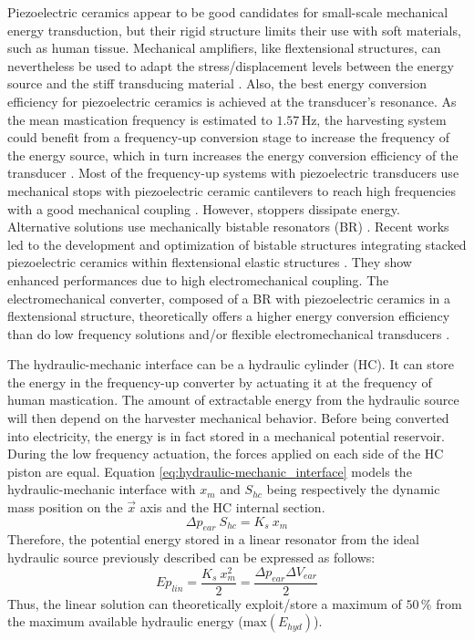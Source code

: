 \documentclass[3p,twocolumn,preprint]{elsarticle}
\begin{document}
Piezoelectric ceramics appear to be good candidates for small-scale mechanical energy transduction, but their rigid structure limits their use with soft materials, such as human tissue. Mechanical amplifiers, like flextensional structures, can nevertheless be used to adapt the stress/displacement levels between the energy source and the stiff transducing material \cite{Abdelnaby2016}. Also, the best energy conversion efficiency for piezoelectric ceramics is achieved at the transducer's resonance. As the mean mastication frequency is estimated to \mbox{$1.57$\,Hz}, the harvesting system could benefit from a frequency-up conversion stage to increase the frequency of the energy source, which in turn increases the energy conversion efficiency of the transducer \cite{Ashraf2011,Peng2021}. Most of the frequency-up systems with piezoelectric transducers use mechanical stops with piezoelectric ceramic cantilevers to reach high frequencies with a good mechanical coupling \cite{Edwards2013,Gu2011,Lee2007}. However, stoppers dissipate energy. Alternative solutions use mechanically bistable resonators (BR) \cite{Vocca2012}. Recent works led to the development and optimization of bistable structures integrating stacked piezoelectric ceramics within flextensional elastic structures \cite{Huguet2017}. They show enhanced performances due to high electromechanical coupling. The electromechanical converter, composed of a BR with piezoelectric ceramics in a flextensional structure, theoretically offers a higher energy conversion efficiency than do low frequency solutions and/or flexible electromechanical transducers \cite{Abdelnaby2016,Peng2021}.

The hydraulic-mechanic interface can be a hydraulic cylinder (HC). It can store the energy in the frequency-up converter by actuating it at the frequency of human mastication. The amount of extractable energy from the hydraulic source will then depend on the harvester mechanical behavior. Before being converted into electricity, the energy is in fact stored in a mechanical potential reservoir. During the low frequency actuation, the forces applied on each side of the HC piston are equal. Equation \ref{eq:hydraulic-mechanic_interface} models the hydraulic-mechanic interface with $x_{m}$ and $ S_{hc}$ being respectively the dynamic mass position on the $\vec{x}$ axis and the HC internal section.
\begin{equation}
	\Delta p_{ear}\ S_{hc} = K_{s}\ x_{m}
	\label{eq:hydraulic-mechanic_interface}
\end{equation}
Therefore, the potential energy stored in a linear resonator from the ideal hydraulic source previously described can be expressed as follows:
\begin{equation}
	Ep_{lin} = \dfrac{K_s\ x_{m}^2}{2} = \dfrac{\Delta p_{ear} \Delta V_{ear}}{2}
	\label{eq:best_linear_soution}
\end{equation}
Thus, the linear solution can theoretically exploit/store a maximum of $50\,\%$ from the maximum available hydraulic energy ($\text{max}(E_{hyd})$). 
\end{document}

